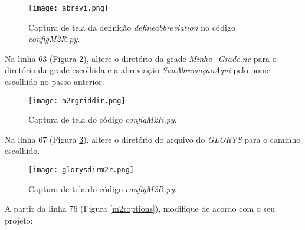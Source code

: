 \begin{figure}[H]
    \centering
    \texttt{[image: abrevi.png]}
    \caption{Captura de tela da definição \textit{defineabbreviation} no código \textit{configM2R.py}.}
    \label{abrev}
\end{figure}
\bigskip

\noindent Na linha 63 (Figura \textcolor{bleu_cite}{\ref{gradediretoriom2r}}), altere o diretório da grade \textit{Minha\_Grade.nc} para o diretório da grade escolhida e a abreviação \textit{SuaAbreviaçãoAqui} pelo nome escolhido no passo anterior.
\bigskip

\begin{figure}[H]
    \centering
    \texttt{[image: m2rgriddir.png]}
    \caption{Captura de tela do código \textit{configM2R.py}.}
    \label{gradediretoriom2r}
\end{figure}
\bigskip

\noindent Na linha 67 (Figura \textcolor{bleu_cite}{\ref{glorysdirm2r}}), altere o diretório do arquivo do \textit{GLORYS} para o caminho escolhido.
\bigskip


\begin{figure}[H]
    \centering
    \texttt{[image: glorysdirm2r.png]}
    \caption{Captura de tela do código \textit{configM2R.py}.}
    \label{glorysdirm2r}
\end{figure}
\bigskip

\noindent A partir da linha 76 (Figura \textcolor{bleu_cite}{\ref{m2roptions}}), modifique de acordo com o seu projeto:
\bigskip

